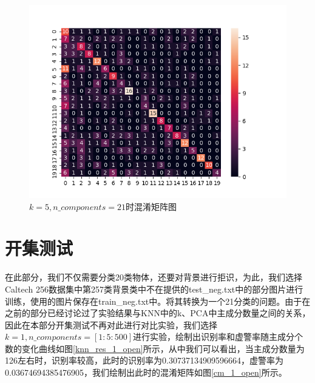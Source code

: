 \documentclass[cn]{elegantbook}
\begin{document}
\begin{figure}[!h]
	\centering
	\includegraphics[width=0.9\linewidth]{../results/cm_5}
	\caption{\label{cm_3}$k=5, n\_components=21$时混淆矩阵图}
\end{figure}

\section{开集测试}
在此部分，我们不仅需要分类20类物体，还要对背景进行拒识，为此，我们选择Caltech 256数据集中第257类背景类中不在提供的test\_neg.txt中的部分图片进行训练，使用的图片保存在train\_neg.txt中。将其转换为一个21分类的问题。由于在之前的部分已经讨论过了实验结果与KNN中的k、PCA中主成分数量之间的关系，因此在本部分开集测试不再对此进行对比实验，我们选择$k=1, n\_components=[1:5:500]$进行实验，绘制出识别率和虚警率随主成分个数的变化曲线如图\ref{knn_res_1_open}所示，从中我们可以看出，当主成分数量为126左右时，识别率较高，此时的识别率为0.30737134909596664，虚警率为0.03674694385476905，我们绘制出此时的混淆矩阵如图\ref{cm_1_open}所示。
\end{document}
